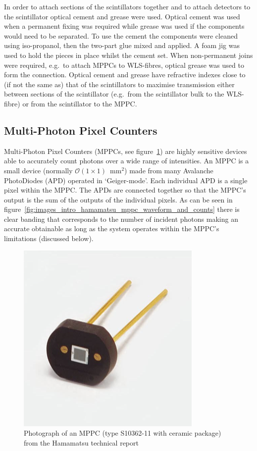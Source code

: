 In order to attach sections of the scintillators together and to attach detectors to the scintillator optical cement and grease were used. Optical cement was used when a permanent fixing was required while grease was used if the components would need to be separated. To use the cement the components were cleaned using iso-propanol, then the two-part glue mixed and applied. A foam jig was used to hold the pieces in place whilst the cement set. When non-permanent joins were required, e.g.\ to attach MPPCs to WLS-fibres, optical grease was used to form the connection. Optical cement and grease have refractive indexes close to (if not the same as) that of the scintillators to maximise transmission either between sections of the scintillator (e.g.\ from the scintillator bulk to the WLS-fibre) or from the scintillator to the MPPC.

\subsection{Multi-Photon Pixel Counters} %
\label{sub:multi_photon_pixel_counters}
Multi-Photon Pixel Counters (MPPCs, see figure~\ref{fig:images_intro_MPPC_from_hammamatsu_report}) are highly sensitive devices able to accurately count photons over a wide range of intensities. An MPPC is a small device (normally \( \mathcal{O}(1\times1) \)~mm\(^2\)) made from many Avalanche PhotoDiodes (APD) operated in `Geiger-mode'. Each individual APD is a single pixel within the MPPC. The APDs are connected together so that the MPPC's output is the sum of the outputs of the individual pixels. As can be seen in figure~\ref{fig:images_intro_hamamatsu_mppc_waveform_and_counts} there is clear banding that corresponds to the number of incident photons making an accurate obtainable as long as the system operates within the MPPC's limitations (discussed below).
\begin{figure}[hptb]
  \centering
    \includegraphics[width=.3\textwidth]{images/intro/MPPC_from_hammamatsu_report.png}
  \caption{Photograph of an MPPC (type S10362-11 with ceramic package) from the Hamamatsu technical report~\cite{hamamatsu_mppc_tech_report}}
  \label{fig:images_intro_MPPC_from_hammamatsu_report}
\end{figure}

